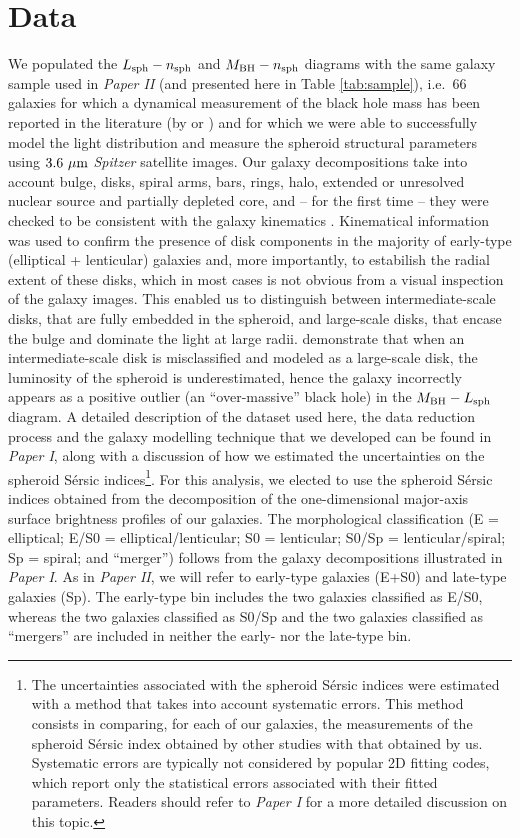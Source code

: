 \documentclass[preprint2]{emulateapj}
\begin{document}
\section{Data}
We populated the $L_{\rm sph} - n_{\rm sph}$ and $M_{\rm BH} - n_{\rm sph}$ diagrams 
with the same galaxy sample used in \emph{Paper II} (and presented here in Table \ref{tab:sample}), 
i.e.~66 galaxies for which a dynamical measurement of the black hole mass has been reported in the literature 
(by \citealt{grahamscott2013} or \citealt{rusli2013}) 
and for which we were able to successfully model the light distribution and measure the spheroid structural parameters 
using $3.6\rm~\mu m$ \emph{Spitzer} satellite images. 
Our galaxy decompositions take into account bulge, disks, spiral arms, bars, rings, halo, 
extended or unresolved nuclear source and partially depleted core, 
and -- for the first time -- they were checked to be consistent with the galaxy kinematics 
\citep{atlas3dIII,scott2014,arnold2014}. 
Kinematical information was used to confirm the presence of disk components 
in the majority of early-type (elliptical + lenticular) galaxies and, more importantly,  
to estabilish the radial extent of these disks, 
which in most cases is not obvious from a visual inspection of the galaxy images. 
This enabled us to distinguish between intermediate-scale disks, 
that are fully embedded in the spheroid,  
and large-scale disks, that encase the bulge and dominate the light at large radii.  
\cite{ellicular} demonstrate that when an intermediate-scale disk is misclassified and modeled as a large-scale disk, 
the luminosity of the spheroid is underestimated, 
hence the galaxy incorrectly appears as a positive outlier (an ``over-massive'' black hole) in the $M_{\rm BH} - L_{\rm sph}$ diagram. 
A detailed description of the dataset used here, the data reduction process and the galaxy modelling technique that we developed 
can be found in \emph{Paper I}, 
along with a discussion of how we estimated the uncertainties on the spheroid S\'ersic indices\footnote{The uncertainties associated with 
the spheroid S\'ersic indices were estimated with a method that takes into account systematic errors. 
This method consists in comparing, for each of our galaxies, the measurements of the spheroid S\'ersic index obtained by other studies 
with that obtained by us. 
Systematic errors are typically not considered by popular 2D fitting codes, which report only the statistical errors 
associated with their fitted parameters. 
Readers should refer to \emph{Paper I} for a more detailed discussion on this topic. }. 
For this analysis, we elected to use the spheroid S\'ersic indices obtained from the decomposition of the one-dimensional 
major-axis surface brightness profiles of our galaxies.  
The morphological classification (E = elliptical; E/S0 = elliptical/lenticular; S0 = lenticular; 
S0/Sp = lenticular/spiral; Sp = spiral; and ``merger'') follows from the galaxy decompositions illustrated in \emph{Paper I}. 
As in \emph{Paper II}, we will refer to early-type galaxies (E+S0) and late-type galaxies (Sp). 
The early-type bin includes the two galaxies classified as E/S0, 
whereas the two galaxies classified as S0/Sp and the two galaxies classified as ``mergers'' are included in neither the early- nor the late-type bin.
\end{document}
